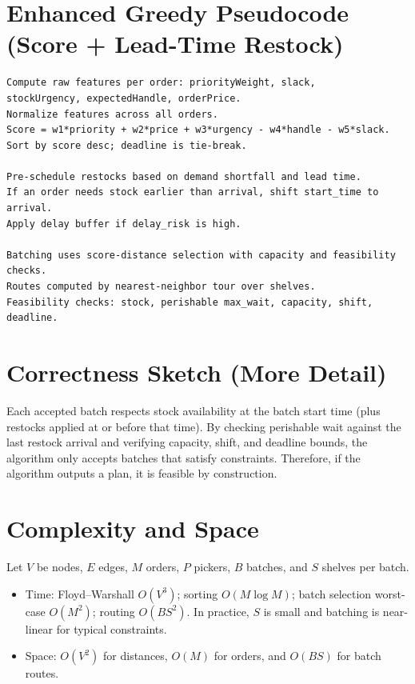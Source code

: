\documentclass[11pt]{article}
\begin{document}
\section{Enhanced Greedy Pseudocode (Score + Lead-Time Restock)}
\begin{verbatim}
Compute raw features per order: priorityWeight, slack,
stockUrgency, expectedHandle, orderPrice.
Normalize features across all orders.
Score = w1*priority + w2*price + w3*urgency - w4*handle - w5*slack.
Sort by score desc; deadline is tie-break.

Pre-schedule restocks based on demand shortfall and lead time.
If an order needs stock earlier than arrival, shift start_time to arrival.
Apply delay buffer if delay_risk is high.

Batching uses score-distance selection with capacity and feasibility checks.
Routes computed by nearest-neighbor tour over shelves.
Feasibility checks: stock, perishable max_wait, capacity, shift, deadline.
\end{verbatim}

\section{Correctness Sketch (More Detail)}
Each accepted batch respects stock availability at the batch start time (plus restocks applied at or before that time). By checking perishable wait against the last restock arrival and verifying capacity, shift, and deadline bounds, the algorithm only accepts batches that satisfy constraints. Therefore, if the algorithm outputs a plan, it is feasible by construction.

\section{Complexity and Space}
Let $V$ be nodes, $E$ edges, $M$ orders, $P$ pickers, $B$ batches, and $S$ shelves per batch.
\begin{itemize}[leftmargin=1.25em]
    \item Time: Floyd--Warshall $O(V^3)$; sorting $O(M \log M)$; batch selection worst-case $O(M^2)$; routing $O(B S^2)$. In practice, $S$ is small and batching is near-linear for typical constraints.
    \item Space: $O(V^2)$ for distances, $O(M)$ for orders, and $O(BS)$ for batch routes.
\end{itemize}
\end{document}
